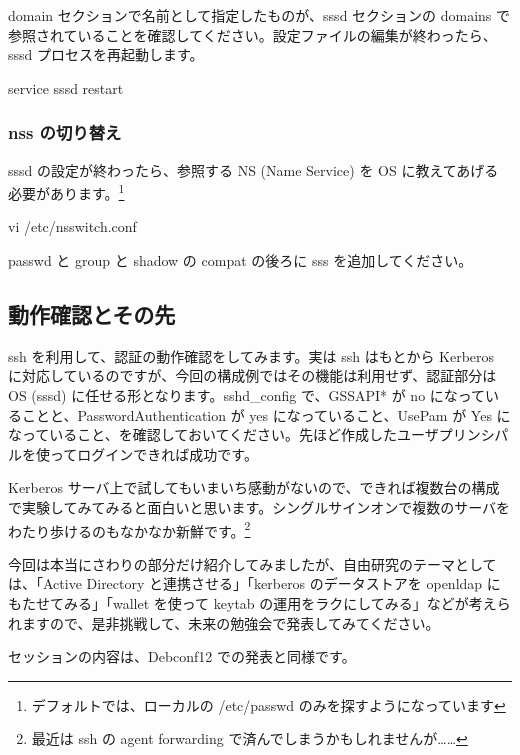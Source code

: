 \documentclass[mingoth,a4paper]{jsarticle}
\begin{document}
domain セクションで名前として指定したものが、sssd セクションの domains で参照されていることを確認してください。設定ファイルの編集が終わったら、sssd プロセスを再起動します。

\begin{commandline}
service sssd restart
\end{commandline}

\subsubsection{nss の切り替え}

sssd の設定が終わったら、参照する NS (Name Service) を OS に教えてあげる必要があります。\footnote{デフォルトでは、ローカルの /etc/passwd のみを探すようになっています}

\begin{commandline}
vi /etc/nsswitch.conf
\end{commandline}

passwd と group と shadow の compat の後ろに sss を追加してください。

\subsection{動作確認とその先}

ssh を利用して、認証の動作確認をしてみます。実は ssh はもとから Kerberos に対応しているのですが、今回の構成例ではその機能は利用せず、認証部分は OS (sssd) に任せる形となります。sshd\_config で、GSSAPI* が no になっていることと、PasswordAuthentication が yes になっていること、UsePam が Yes になっていること、を確認しておいてください。先ほど作成したユーザプリンシパルを使ってログインできれば成功です。

Kerberos サーバ上で試してもいまいち感動がないので、できれば複数台の構成で実験してみてみると面白いと思います。シングルサインオンで複数のサーバをわたり歩けるのもなかなか新鮮です。\footnote{最近は ssh の agent forwarding で済んでしまうかもしれませんが……}

今回は本当にさわりの部分だけ紹介してみましたが、自由研究のテーマとしては、「Active Directory と連携させる」「kerberos のデータストアを openldap にもたせてみる」「wallet を使って keytab の運用をラクにしてみる」などが考えられますので、是非挑戦して、未来の勉強会で発表してみてください。

\clearpage


セッションの内容は、Debconf12 での発表と同様です。
\end{document}
